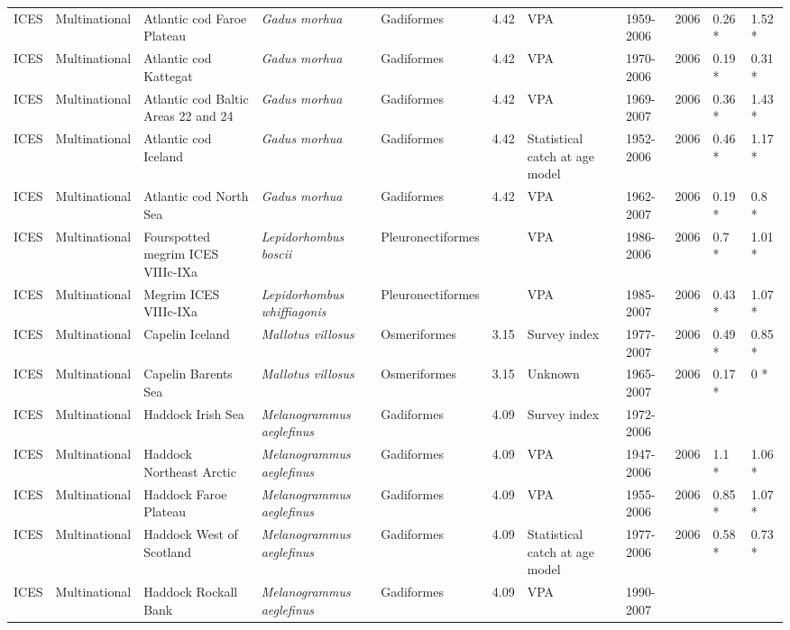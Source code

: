 \begin{longtable}{p{1.5cm}p{1.5cm}p{3cm}p{3cm}p{2.5cm}p{0.9cm}p{1.4cm}p{0.9cm}p{0.9cm}p{0.9cm}p{1cm}}
  ICES & Multinational & Atlantic cod Faroe Plateau & \textit{Gadus morhua} & Gadiformes & 4.42 & VPA & 1959-2006 & 2006 & 0.26 * & 1.52 * \\ 
  ICES & Multinational & Atlantic cod Kattegat & \textit{Gadus morhua} & Gadiformes & 4.42 & VPA & 1970-2006 & 2006 & 0.19 * & 0.31 * \\ 
  ICES & Multinational & Atlantic cod Baltic Areas 22 and 24 & \textit{Gadus morhua} & Gadiformes & 4.42 & VPA & 1969-2007 & 2006 & 0.36 * & 1.43 * \\ 
  ICES & Multinational & Atlantic cod Iceland & \textit{Gadus morhua} & Gadiformes & 4.42 & Statistical catch at age model & 1952-2006 & 2006 & 0.46 * & 1.17 * \\ 
  ICES & Multinational & Atlantic cod North Sea & \textit{Gadus morhua} & Gadiformes & 4.42 & VPA & 1962-2007 & 2006 & 0.19 * & 0.8 * \\ 
  ICES & Multinational & Fourspotted megrim ICES VIIIc-IXa & \textit{Lepidorhombus boscii} & Pleuronectiformes &  & VPA & 1986-2006 & 2006 & 0.7 * & 1.01 * \\ 
  ICES & Multinational & Megrim ICES VIIIc-IXa & \textit{Lepidorhombus whiffiagonis} & Pleuronectiformes &  & VPA & 1985-2007 & 2006 & 0.43 * & 1.07 * \\ 
  ICES & Multinational & Capelin Iceland & \textit{Mallotus villosus} & Osmeriformes & 3.15 & Survey index & 1977-2007 & 2006 & 0.49 * & 0.85 * \\ 
  ICES & Multinational & Capelin Barents Sea & \textit{Mallotus villosus} & Osmeriformes & 3.15 & Unknown & 1965-2007 & 2006 & 0.17 * & 0 * \\ 
  ICES & Multinational & Haddock Irish Sea & \textit{Melanogrammus aeglefinus} & Gadiformes & 4.09 & Survey index & 1972-2006 &  &  &  \\ 
  ICES & Multinational & Haddock Northeast Arctic & \textit{Melanogrammus aeglefinus} & Gadiformes & 4.09 & VPA & 1947-2006 & 2006 & 1.1 * & 1.06 * \\ 
  ICES & Multinational & Haddock Faroe Plateau & \textit{Melanogrammus aeglefinus} & Gadiformes & 4.09 & VPA & 1955-2006 & 2006 & 0.85 * & 1.07 * \\ 
  ICES & Multinational & Haddock West of Scotland & \textit{Melanogrammus aeglefinus} & Gadiformes & 4.09 & Statistical catch at age model & 1977-2006 & 2006 & 0.58 * & 0.73 * \\ 
  ICES & Multinational & Haddock Rockall Bank & \textit{Melanogrammus aeglefinus} & Gadiformes & 4.09 & VPA & 1990-2007 &  &  &  \\ 

\end{longtable}
